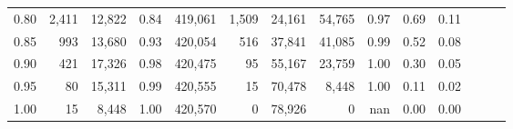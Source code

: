 \begin{tabular}{rrrrrrrrrrrrrr}
0.80 &   2,411 &  12,822 &  0.84 &  419,061 &    1,509 &  24,161 &  54,765 &  0.97 &  0.69 &      0.11 \\
0.85 &     993 &  13,680 &  0.93 &  420,054 &      516 &  37,841 &  41,085 &  0.99 &  0.52 &      0.08 \\
0.90 &     421 &  17,326 &  0.98 &  420,475 &       95 &  55,167 &  23,759 &  1.00 &  0.30 &      0.05 \\
0.95 &      80 &  15,311 &  0.99 &  420,555 &       15 &  70,478 &   8,448 &  1.00 &  0.11 &      0.02 \\
1.00 &      15 &   8,448 &  1.00 &  420,570 &        0 &  78,926 &       0 &   nan &  0.00 &      0.00 \\
\bottomrule
\end{tabular}

